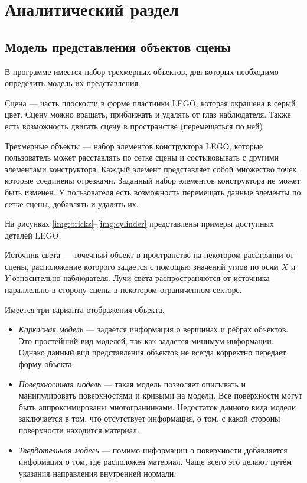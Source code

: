 \chapter{Аналитический раздел}

\section{Модель представления объектов сцены}

В программе имеется набор трехмерных объектов, для которых необходимо определить модель их представления.

Сцена --- часть плоскости в форме пластинки LEGO, которая окрашена в серый цвет. Сцену можно вращать, приближать и удалять от глаз наблюдателя. Также есть возможность двигать сцену в пространстве (перемещаться по ней).

Трехмерные объекты --- набор элементов конструктора LEGO, которые пользователь может расставлять по сетке сцены и состыковывать с другими элементами конструктора. Каждый элемент представляет собой множество точек, которые соединены отрезками. Заданный набор элементов конструктора не может быть изменен. У пользователя есть возможность перемещать данные элементы по сетке сцены, добавлять и удалять их.

На рисунках \ref{img:bricks}--\ref{img:cylinder} представлены примеры доступных деталей LEGO.

\clearpage

Источник света --- точечный объект в пространстве на некотором расстоянии от сцены, расположение которого задается с помощью значений углов по осям $X$ и $Y$ относительно наблюдателя. Лучи света распространяются от источника параллельно в сторону сцены в некотором ограниченном секторе.

Имеется три варианта отображения объекта.
\begin{itemize}[label=---]
    \item \textit{Каркасная модель} --- задается информация о вершинах и рёбрах объектов. Это простейший вид моделей, так как задается минимум информации. Однако данный вид представления объектов не всегда корректно передает форму объекта.
    \item \textit{Поверхностная модель} ---  такая модель позволяет описывать и манипулировать поверхностями и кривыми на модели. Все поверхности могут быть аппроксимированы многогранниками. Недостаток данного вида модели заключается в том, что отсутствует информация, о том, с какой стороны поверхности находится материал.
    \item \textit{Твердотельная модель} --- помимо информации о поверхности добавляется информация о том, где расположен материал. Чаще всего это делают путём указания направления внутренней нормали.
\end{itemize}

